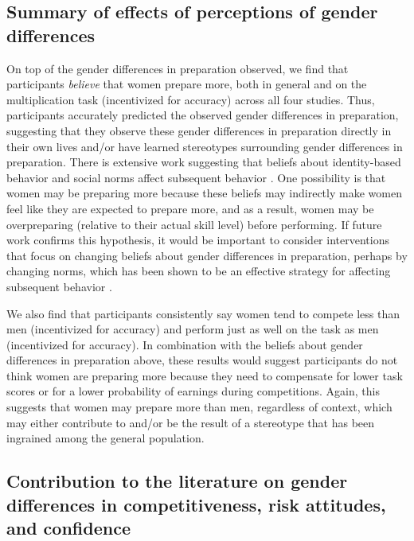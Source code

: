 \documentclass[a4paper, nobind]{templates/ociamthesis}
\begin{document}
\hypertarget{summary-of-effects-of-perceptions-of-gender-differences}{%
\subsection{Summary of effects of perceptions of gender differences}\label{summary-of-effects-of-perceptions-of-gender-differences}}

On top of the gender differences in preparation observed, we find that participants \emph{believe} that women prepare more, both in general and on the multiplication task (incentivized for accuracy) across all four studies. Thus, participants accurately predicted the observed gender differences in preparation, suggesting that they observe these gender differences in preparation directly in their own lives and/or have learned stereotypes surrounding gender differences in preparation. There is extensive work suggesting that beliefs about identity-based behavior and social norms affect subsequent behavior \autocite{Babcock2012,Bowles2007,Toosi2019,Smith2014,Benjamin2010c,Bertrand2015,Akerlof2000}. One possibility is that women may be preparing more because these beliefs may indirectly make women feel like they are expected to prepare more, and as a result, women may be overpreparing (relative to their actual skill level) before performing. If future work confirms this hypothesis, it would be important to consider interventions that focus on changing beliefs about gender differences in preparation, perhaps by changing norms, which has been shown to be an effective strategy for affecting subsequent behavior \autocite{Miller2016}.

We also find that participants consistently say women tend to compete less than men (incentivized for accuracy) and perform just as well on the task as men (incentivized for accuracy). In combination with the beliefs about gender differences in preparation above, these results would suggest participants do not think women are preparing more because they need to compensate for lower task scores or for a lower probability of earnings during competitions. Again, this suggests that women may prepare more than men, regardless of context, which may either contribute to and/or be the result of a stereotype that has been ingrained among the general population.

\hypertarget{contribution-to-the-literature-on-gender-differences-in-competitiveness-risk-attitudes-and-confidence}{%
\subsection{Contribution to the literature on gender differences in competitiveness, risk attitudes, and confidence}\label{contribution-to-the-literature-on-gender-differences-in-competitiveness-risk-attitudes-and-confidence}}
\end{document}
